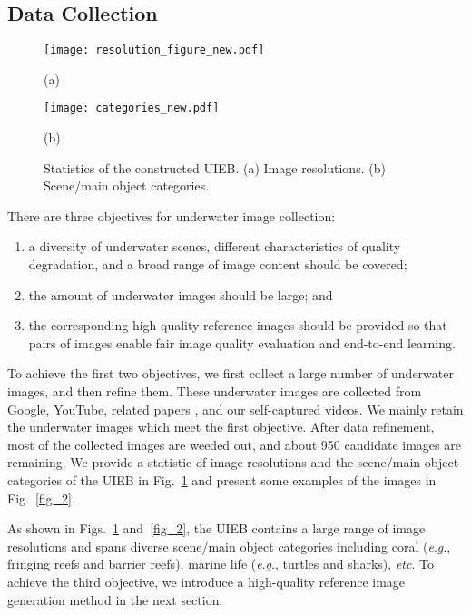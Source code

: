 \documentclass[journal]{IEEEtran}
\newcommand{\eg}{\textit{e}.\textit{g}.}
\newcommand{\etc}{\textit{etc}}
\begin{document}
\subsection{Data Collection}

\begin{figure}[!htb]
  \centering
\begin{minipage}[b]{0.3\linewidth}
  \centering
  \centerline{\texttt{[image: resolution\_figure\_new.pdf]}}
\centerline{(a)}\medskip
\end{minipage}

 \begin{minipage}[b]{0.3\linewidth}
  \centering
  \centerline{\texttt{[image: categories\_new.pdf]}}
\centerline{(b)}\medskip
\end{minipage}
 \caption{Statistics of the constructed UIEB. (a) Image resolutions. (b) Scene/main object categories.}
\label{fig:Statistics}
\end{figure}

There are three objectives for underwater image collection:


\begin{enumerate}
  \item a diversity of underwater scenes, different characteristics of quality degradation, and a broad range of image content should be covered;
  \item the amount of underwater images should be large; and
  \item the corresponding high-quality reference images should be provided so that pairs of images enable fair image quality evaluation and end-to-end learning.
\end{enumerate}

To achieve the first two objectives, we first collect a large number of underwater images, and then refine them. These underwater images
are collected from Google, YouTube, related papers \cite{Treibitz2009,Ancuti2012,Fu2017,Fu2014,Galdran2015}, and our self-captured videos. We mainly retain the underwater images which meet the first objective. After data refinement, most of the collected images are weeded out, and about 950 candidate images are remaining. We provide a statistic of image resolutions and the scene/main object categories of the UIEB in Fig.~\ref{fig:Statistics} and present some examples of the images in Fig.~\ref{fig_2}.




As shown in Figs.~\ref{fig:Statistics} and~\ref{fig_2}, the UIEB contains a large range of image resolutions and spans diverse scene/main object categories including coral (\eg, fringing reefs and barrier reefs), marine life (\eg, turtles and sharks), \etc. To achieve the third objective, we introduce a high-quality reference image generation method in the next section.
\end{document}
